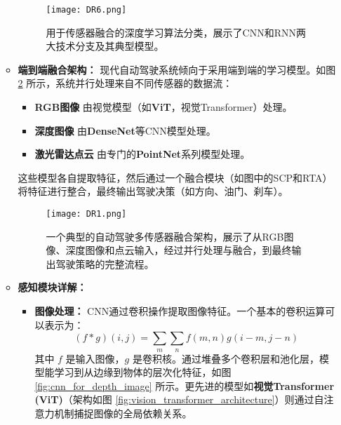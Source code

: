\begin{itemize}
\begin{itemize}
        \begin{figure}[htbp]
            \centering
            \texttt{[image: DR6.png]}
            \caption{用于传感器融合的深度学习算法分类，展示了CNN和RNN两大技术分支及其典型模型。}
            \label{fig:deep_learning_sensor_fusion_algorithms}
        \end{figure}
        
        \item \textbf{端到端融合架构：} 现代自动驾驶系统倾向于采用端到端的学习模型。如图 \ref{fig:multisensor_fusion_architecture} 所示，系统并行处理来自不同传感器的数据流：
        \begin{itemize}
            \item \textbf{RGB图像} 由视觉模型（如\textbf{ViT}，视觉Transformer）处理。
            \item \textbf{深度图像} 由\textbf{DenseNet}等CNN模型处理。
            \item \textbf{激光雷达点云} 由专门的\textbf{PointNet}系列模型处理。
        \end{itemize}
        这些模型各自提取特征，然后通过一个融合模块（如图中的SCP和RTA）将特征进行整合，最终输出驾驶决策（如方向、油门、刹车）。

        \begin{figure}[htbp]
            \centering
            \texttt{[image: DR1.png]}
            \caption{一个典型的自动驾驶多传感器融合架构，展示了从RGB图像、深度图像和点云输入，经过并行处理与融合，到最终输出驾驶策略的完整流程。}
            \label{fig:multisensor_fusion_architecture}
        \end{figure}
        
        \item \textbf{感知模块详解：}
        \begin{itemize}
            \item \textbf{图像处理：} CNN通过卷积操作提取图像特征。一个基本的卷积运算可以表示为：
            $$
            (f * g)(i,j) = \sum_m \sum_n f(m,n) g(i-m, j-n)
            $$
            其中 $f$ 是输入图像，$g$ 是卷积核。通过堆叠多个卷积层和池化层，模型能学习到从边缘到物体的层次化特征，如图 \ref{fig:cnn_for_depth_image} 所示。更先进的模型如\textbf{视觉Transformer (ViT)}（架构如图 \ref{fig:vision_transformer_architecture}）则通过自注意力机制捕捉图像的全局依赖关系。


\end{itemize}
\end{itemize}
\end{itemize}
